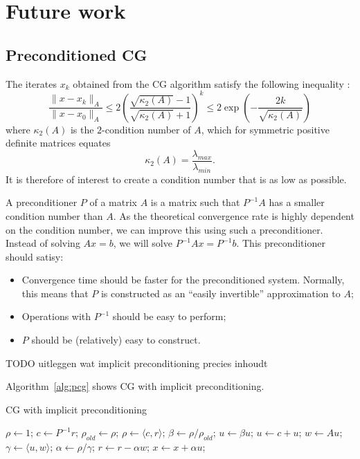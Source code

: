 \documentclass[11pt]{amsart}
\theoremstyle{definition}
\begin{document}
\section{Future work}
\subsection{Preconditioned CG}
The iterates $x_k$ obtained from the CG algorithm satisfy the following inequality \cite[Lect.~7]{sleij}:
\[
  \frac{\|x - x_k\|_A}{\|x - x_0\|_A} \leq 2 \left( \frac{ \sqrt{\kappa_2(A)}-1}{\sqrt{\kappa_2(A)}+1}\right)^k \leq 2 \exp \left( -\frac{2k}{\sqrt{\kappa_2(A)}}\right) 
\]
where $\kappa_2(A)$ is the $2$-condition number of $A$, which for symmetric positive definite matrices equates
\[
  \kappa_2(A) = \frac{\lambda_{max}}{\lambda_{min}}.
\]
It is therefore of interest to create a condition number that is as low as possible.

A preconditioner $P$ of a matrix $A$ is a matrix such that $P^{-1}A$ has a smaller condition number than $A$. As the theoretical convergence rate is highly dependent on the condition number, we can improve this using such a preconditioner. Instead of solving $Ax = b$, we will solve $P^{-1}Ax = P^{-1}b$. This preconditioner should satisy:
\begin{itemize}
  \item Convergence time should be faster for the preconditioned system. Normally, this means that $P$ is constructed as an ``easily invertible'' approximation to $A$;
  \item Operations with $P^{-1}$ should be easy to perform;
  \item $P$ should be (relatively) easy to construct.
\end{itemize}

TODO uitleggen wat implicit preconditioning precies inhoudt

Algorithm~\ref{alg:pcg} shows CG with implicit preconditioning. \cite[Lect.~10]{sleij}
\begin{algorithm}
  \caption{CG with implicit preconditioning \cite[Lect.~10]{sleij}}
  \label{alg:pcg}
  \begin{algorithmic}
    \State $\rho \gets 1$;
      \State $c \gets P^{-1} r$; 
      \State $\rho_{old} \gets \rho$;
      \State $\rho \gets \langle c, r \rangle$;
      \State
        \State $\beta \gets \rho/\rho_{old}$;
        \State $u \gets \beta u$;
      \EndIf
      \State
      \State $u \gets c + u$;
      \State $w \gets Au$;
      \State $\gamma \gets \langle u, w \rangle$;
      \State $\alpha \gets \rho/\gamma$;
      \State $r \gets r - \alpha w$;
      \State $x \gets x + \alpha u$;
    \EndWhile
  \end{algorithmic}
\end{algorithm}
\end{document}
